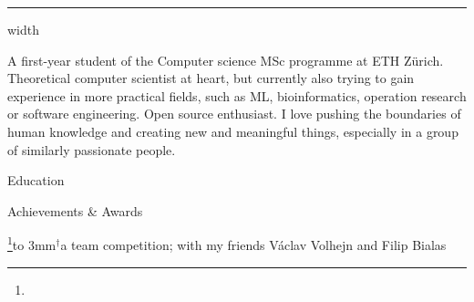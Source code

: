 \newif\ifdoublecolumn
\doublecolumnfalse



\newdimen\hei
\hei=3cm

\vskip 2mm
\hrule width \hsize

\vskip 3mm

{\I
%
A first-year student of the Computer science MSc programme at ETH Zürich.
Theoretical computer scientist at heart, but currently also trying to gain
experience in more practical fields, such as ML, bioinformatics, operation
research or software engineering.
%
Open source enthusiast.
%
I love pushing the boundaries of human knowledge and creating new and
meaningful things, especially in a group of similarly passionate people.
}

\sekce Education


\sekce Achievements \& Awards

\footnote{}{\hskip -3mm\hbox to 3mm{$^\dagger$\hss}a team competition; with my friends Václav Volhejn and Filip Bialas}

